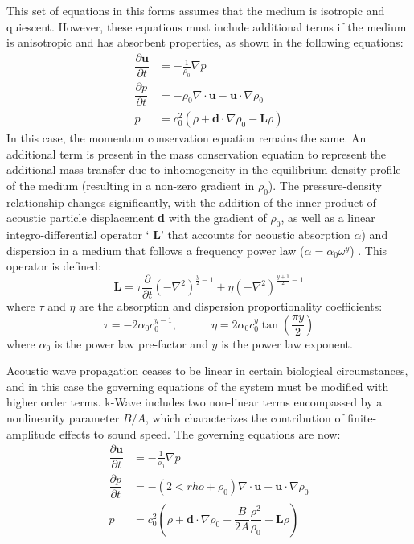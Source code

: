 \documentclass[10pt,a4paper]{article}
\begin{document}
This set of equations in this forms assumes that the medium is isotropic and quiescent. However, these equations must include additional terms if the medium is anisotropic and has absorbent properties, as shown in the following equations:
\begin{align}
\dfrac{\partial \textbf{u}}{\partial t} &= - \frac{1}{\rho_0} \nabla p\\
\dfrac{\partial p }{\partial t} &= - \rho_0 \nabla \cdot \textbf{u} - \textbf{u}\cdot \nabla \rho_0 \\
p &= c_0^2 (\rho + \textbf{d}\cdot\nabla \rho_0 -\textbf{L}\rho)
\end{align}
In this case, the momentum conservation equation remains the same. An additional term is present in the mass conservation equation to represent the additional mass transfer due to inhomogeneity in the equilibrium density profile of the medium (resulting in a non-zero gradient in $\rho_0$). The pressure-density relationship changes significantly, with the addition of the inner product of acoustic particle displacement \textbf{d} with the gradient of $\rho_0$, as well as a linear integro-differential operator ` \textbf{L}' that accounts for acoustic absorption $\alpha$) and dispersion in a medium that follows a frequency power law ($\alpha = \alpha_0 \omega^y$)  . This operator is defined:
\begin{equation}\label{Powerlawabsorption}
\textbf{L} = \tau \frac{\partial}{\partial t} ( - \nabla^2)^{\frac{y}{2} - 1} + \eta (-\nabla^2)^{\frac{y+1}{2} -1}
\end{equation}
where $\tau$ and $\eta$ are the absorption and dispersion proportionality coefficients:
\begin{equation}
\tau = -2\alpha_0c_0^{y-1}, \quad \quad \quad \eta = 2 \alpha_0c_0^y \tan \left(\frac{\pi y}{2} \right)
\end{equation}
where $\alpha_0$ is the power law pre-factor and $y$ is the power law exponent. 

Acoustic wave propagation ceases to be linear in certain biological circumstances, and in this case the governing equations of the system must be modified with higher order terms. k-Wave includes two non-linear terms   encompassed by a nonlinearity parameter $B/A$, which characterizes the contribution of finite-amplitude effects to sound speed. The governing equations are now:
\begin{align}
\dfrac{\partial \textbf{u}}{\partial t} &= - \frac{1}{\rho_0} \nabla p\\
\dfrac{\partial p }{\partial t} &= - (2<rho+\rho_0) \nabla \cdot \textbf{u} - \textbf{u}\cdot \nabla \rho_0 \\
p &= c_0^2 \left(\rho + \textbf{d}\cdot\nabla \rho_0 + \dfrac{B}{2A} \dfrac{\rho^2}{\rho_0}-\textbf{L}\rho\right)
\end{align}
\end{document}
